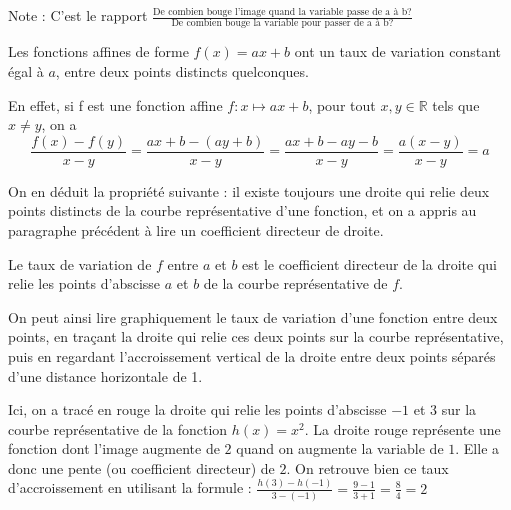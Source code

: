 \documentclass[10pt,a4paper]{book}
\newcommand{\R}{\mathbb{R}}
\begin{document}
Note :  C'est le rapport   $\frac{\text{De combien bouge l'image quand la variable passe de a à b?}}{\text{De combien bouge la variable pour passer de a à b?}}$

\begin{prop}
    Les fonctions affines de forme $f(x)=ax+b$ ont un taux de variation constant égal à $a$, entre deux points distincts quelconques.
\end{prop}

En effet, si f est une fonction affine $f : x \mapsto ax+b$, pour tout $x,y \in \R$ tels que $x \neq y$, on a   
\[\frac{f(x)-f(y)}{x-y} = \frac{ax+b-(ay+b)}{x-y} =  \frac{ax+b-ay-b}{x-y} = \frac{a(x-y)}{x-y} = a\]

On en déduit la propriété suivante : il existe toujours une droite qui relie deux points distincts de la courbe représentative d'une fonction,
et on a appris au paragraphe précédent à lire un coefficient directeur de droite. 

\begin{prop}
    Le taux de variation de $f$ entre $a$ et $b$ est le coefficient directeur de la droite qui relie les points d'abscisse $a$ et $b$ de la courbe représentative de $f$.
\end{prop}


\begin{minipage}{0.45\textwidth}
On peut ainsi lire graphiquement le taux de variation d'une fonction entre deux points, en traçant la droite qui relie ces deux points sur la courbe représentative, puis en regardant l'accroissement vertical de la droite entre deux points séparés d'une distance horizontale de 1. 
\vspace{1cm}

Ici, on a tracé en rouge la droite qui relie les points d'abscisse $-1$ et $3$ sur la courbe représentative de la fonction $h(x)=x^2$. La droite rouge représente une fonction dont l'image augmente de $2$ quand on augmente la variable de $1$. 
Elle a donc une pente (ou coefficient directeur) de $2$.  On retrouve bien ce taux d'accroissement en utilisant la formule :  $\frac{h(3)-h(-1)}{3-(-1)}=\frac{9-1}{3+1}=\frac{8}{4}=2$ 
\end{minipage}
\begin{minipage}{0.52\textwidth}
    \end{minipage}
\end{document}

